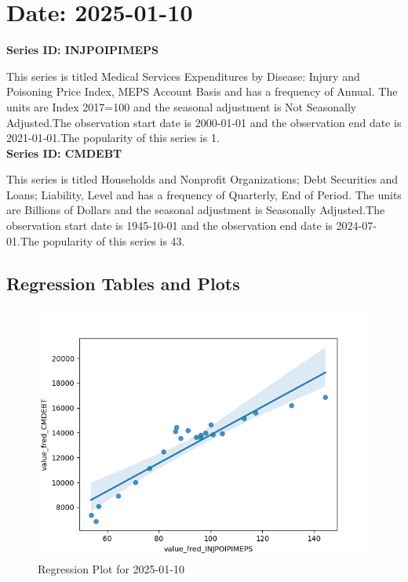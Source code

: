 \section{Date: 2025-01-10}
\noindent \textbf{Series ID: INJPOIPIMEPS} 

\noindent This series is titled Medical Services Expenditures by Disease: Injury and Poisoning Price Index, MEPS Account Basis and has a frequency of Annual. The units are Index 2017=100 and the seasonal adjustment is Not Seasonally Adjusted.The observation start date is 2000-01-01 and the observation end date is 2021-01-01.The popularity of this series is 1. \\ 

\noindent \textbf{Series ID: CMDEBT} 

\noindent This series is titled Households and Nonprofit Organizations; Debt Securities and Loans; Liability, Level and has a frequency of Quarterly, End of Period. The units are Billions of Dollars and the seasonal adjustment is Seasonally Adjusted.The observation start date is 1945-10-01 and the observation end date is 2024-07-01.The popularity of this series is 43. \\ 

\subsection{Regression Tables and Plots}


\begin{figure}
\centering
\includegraphics[scale = 0.9]{plots/plot_2025-01-10.png}
\caption{Regression Plot for 2025-01-10}
\end{figure}
\newpage
